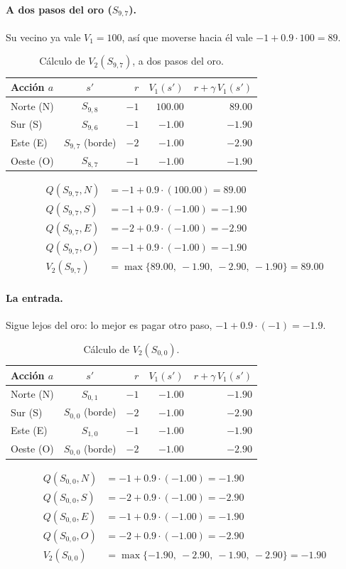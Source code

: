 \documentclass[11pt,letterpaper]{article}
\begin{document}
\paragraph{A dos pasos del oro ($S_{9,7}$).} Su vecino ya vale $V_1 = 100$, así que moverse hacia él vale $-1 + 0.9 \cdot 100 = 89$.
\begin{table}[H]
\centering
\small
\caption{Cálculo de $V_2(S_{9,7})$, a dos pasos del oro.}
\label{tab:it2-dos}
\begin{tabular}{lcrrr}
\toprule
Acción $a$ & $s'$ & $r$ & $V_{1}(s')$ & $r + \gamma\,V_{1}(s')$ \\
\midrule
Norte (N) & $S_{9,8}$ & $-1$ & $100.00$ & $\mathbf{89.00}$ \\
Sur (S) & $S_{9,6}$ & $-1$ & $-1.00$ & $-1.90$ \\
Este (E) & $S_{9,7}$ (borde) & $-2$ & $-1.00$ & $-2.90$ \\
Oeste (O) & $S_{8,7}$ & $-1$ & $-1.00$ & $-1.90$ \\
\bottomrule
\end{tabular}
\end{table}
\begin{align*}
Q(S_{9,7},N) &= -1 + 0.9\cdot(100.00) = 89.00 \\
Q(S_{9,7},S) &= -1 + 0.9\cdot(-1.00) = -1.90 \\
Q(S_{9,7},E) &= -2 + 0.9\cdot(-1.00) = -2.90 \\
Q(S_{9,7},O) &= -1 + 0.9\cdot(-1.00) = -1.90 \\
V_{2}(S_{9,7}) &= \max\{89.00,\ -1.90,\ -2.90,\ -1.90\} = \mathbf{89.00}
\end{align*}

\paragraph{La entrada.} Sigue lejos del oro: lo mejor es pagar otro paso, $-1 + 0.9\cdot(-1) = -1.9$.
\begin{table}[H]
\centering
\small
\caption{Cálculo de $V_2(S_{0,0})$.}
\label{tab:it2-entrada}
\begin{tabular}{lcrrr}
\toprule
Acción $a$ & $s'$ & $r$ & $V_{1}(s')$ & $r + \gamma\,V_{1}(s')$ \\
\midrule
Norte (N) & $S_{0,1}$ & $-1$ & $-1.00$ & $\mathbf{-1.90}$ \\
Sur (S) & $S_{0,0}$ (borde) & $-2$ & $-1.00$ & $-2.90$ \\
Este (E) & $S_{1,0}$ & $-1$ & $-1.00$ & $\mathbf{-1.90}$ \\
Oeste (O) & $S_{0,0}$ (borde) & $-2$ & $-1.00$ & $-2.90$ \\
\bottomrule
\end{tabular}
\end{table}
\begin{align*}
Q(S_{0,0},N) &= -1 + 0.9\cdot(-1.00) = -1.90 \\
Q(S_{0,0},S) &= -2 + 0.9\cdot(-1.00) = -2.90 \\
Q(S_{0,0},E) &= -1 + 0.9\cdot(-1.00) = -1.90 \\
Q(S_{0,0},O) &= -2 + 0.9\cdot(-1.00) = -2.90 \\
V_{2}(S_{0,0}) &= \max\{-1.90,\ -2.90,\ -1.90,\ -2.90\} = \mathbf{-1.90}
\end{align*}
\end{document}
